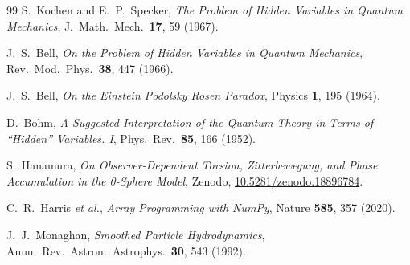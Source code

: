 \documentclass[%
 reprint, amsmath,amssymb, aps, prb, ]{revtex4-2}
\numberwithin{equation}{section}
\begin{document}
\begin{thebibliography}{99}
S.~Kochen and E.~P.~Specker,
\emph{The Problem of Hidden Variables in Quantum Mechanics},
J.~Math.\ Mech.\ \textbf{17}, 59 (1967).

J.~S.~Bell,
\emph{On the Problem of Hidden Variables in Quantum Mechanics},
Rev.~Mod.~Phys.\ \textbf{38}, 447 (1966).

J.~S.~Bell,
\emph{On the Einstein Podolsky Rosen Paradox},
Physics \textbf{1}, 195 (1964).

D.~Bohm,
\emph{A Suggested Interpretation of the Quantum Theory in Terms of ``Hidden'' Variables. I},
Phys.~Rev.\ \textbf{85}, 166 (1952).

S.~Hanamura,
\emph{On Observer-Dependent Torsion, Zitterbewegung, and Phase Accumulation in the 0-Sphere Model},
Zenodo, \href{https://doi.org/10.5281/zenodo.18896784}{10.5281/zenodo.18896784}.

C.~R.~Harris \emph{et al.},
\emph{Array Programming with NumPy},
Nature \textbf{585}, 357 (2020).

J.~J.~Monaghan,
\emph{Smoothed Particle Hydrodynamics},
Annu.~Rev.~Astron.~Astrophys.\ \textbf{30}, 543 (1992).

\end{thebibliography}
\end{document}

